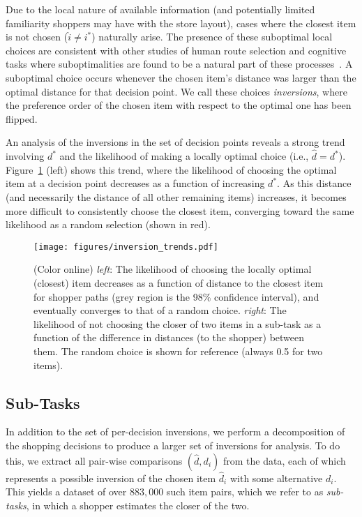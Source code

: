 \documentclass[aps,pre,twocolumn,groupedaddress]{revtex4-2}
\begin{document}
Due to the local nature of available information (and potentially limited familiarity shoppers may have with the store layout), cases where the closest item is not chosen ($\hat{i} \ne i^{*}$) naturally arise. The presence of these suboptimal local choices are consistent with other studies of human route selection and cognitive tasks where suboptimalities are found to be a natural part of these processes~\cite{lima2016understanding,hui2009research}. A suboptimal choice occurs whenever the chosen item's distance was larger than the optimal distance for that decision point. We call these choices \textit{inversions}, where the preference order of the chosen item with respect to the optimal one has been flipped. 

An analysis of the inversions in the set of decision points reveals a strong trend involving $d^{*}$ and the likelihood of making a locally optimal choice (i.e., $\hat{d} = d^{*}$). Figure~\ref{fig:inversion_trends} (left) shows this trend, where the likelihood of choosing the optimal item at a decision point decreases as a function of increasing $d^{*}$. As this distance (and necessarily the distance of all other remaining items) increases, it becomes more difficult to consistently choose the closest item, converging toward the same likelihood as a random selection (shown in red).

\begin{figure}
    \centering
    \texttt{[image: figures/inversion\_trends.pdf]}%
    \caption{(Color online) \textit{left}: The likelihood of choosing the locally optimal (closest) item decreases as a function of distance to the closest item for shopper paths (grey region is the 98\% confidence interval), and eventually converges to that of a random choice. \textit{right}: The likelihood of not choosing the closer of two items in a sub-task as a function of the difference in distances (to the shopper) between them. The random choice is shown for reference (always 0.5 for two items). \label{fig:inversion_trends}}
\end{figure}

\subsection{Sub-Tasks}
In addition to the set of per-decision inversions, we perform a decomposition of the shopping decisions to produce a larger set of inversions for analysis. To do this, we extract all pair-wise comparisons $(\hat{d},d_{i})$ from the data, each of which represents a possible inversion of the chosen item $\hat{d}_{i}$ with some alternative $d_{i}$. This yields a dataset of over $883,000$ such item pairs, which we refer to as \textit{sub-tasks}, in which a shopper estimates the closer of the two. 
\end{document}
